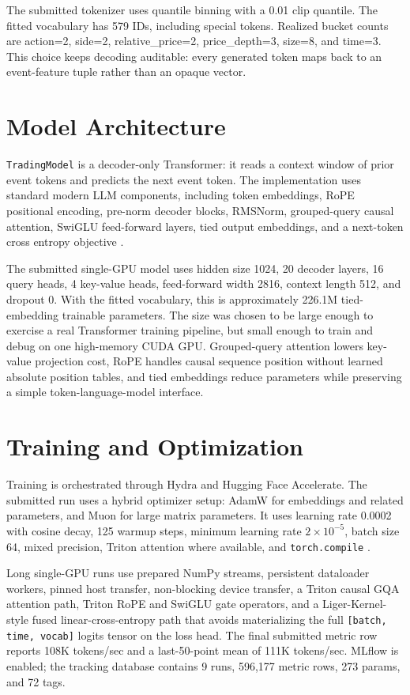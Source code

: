 \documentclass[11pt]{article}
\begin{document}
The submitted tokenizer uses quantile binning with a 0.01 clip quantile. The
fitted vocabulary has 579 IDs, including special tokens. Realized bucket counts
are action=2, side=2, relative\_price=2, price\_depth=3, size=8, and time=3. This
choice keeps decoding auditable: every generated token maps back to an
event-feature tuple rather than an opaque vector.

\section{Model Architecture}

\texttt{TradingModel} is a decoder-only Transformer: it reads a context window
of prior event tokens and predicts the next event token. The implementation uses
standard modern LLM components, including token embeddings, RoPE positional
encoding, pre-norm decoder blocks, RMSNorm, grouped-query causal attention,
SwiGLU feed-forward layers, tied output embeddings, and a next-token cross
entropy objective \cite{vaswani2017attention,llama3}.

The submitted single-GPU model uses hidden size 1024, 20 decoder layers, 16
query heads, 4 key-value heads, feed-forward width 2816, context length 512, and
dropout 0. With the fitted vocabulary, this is approximately 226.1M
tied-embedding trainable parameters. The size was chosen to be large enough to
exercise a real Transformer training pipeline, but small enough to train and
debug on one high-memory CUDA GPU. Grouped-query attention lowers key-value
projection cost, RoPE handles causal sequence position without learned absolute
position tables, and tied embeddings reduce parameters while preserving a
simple token-language-model interface.

\section{Training and Optimization}

Training is orchestrated through Hydra and Hugging Face Accelerate. The
submitted run uses a hybrid optimizer setup: AdamW for embeddings and related
parameters, and Muon for large matrix parameters. It uses learning rate 0.0002
with cosine decay, 125 warmup steps, minimum learning rate \(2\times10^{-5}\),
batch size 64, mixed precision, Triton attention where available, and
\texttt{torch.compile} \cite{triton}.

Long single-GPU runs use prepared NumPy streams, persistent dataloader workers,
pinned host transfer, non-blocking device transfer, a Triton causal GQA
attention path, Triton RoPE and SwiGLU gate operators, and a Liger-Kernel-style
fused linear-cross-entropy path that avoids materializing the full
\texttt{[batch, time, vocab]} logits tensor on the loss head. The final
submitted metric row reports 108K tokens/sec and a last-50-point mean of 111K
tokens/sec. MLflow is enabled; the tracking database contains 9 runs, 596,177
metric rows, 273 params, and 72 tags.
\end{document}
